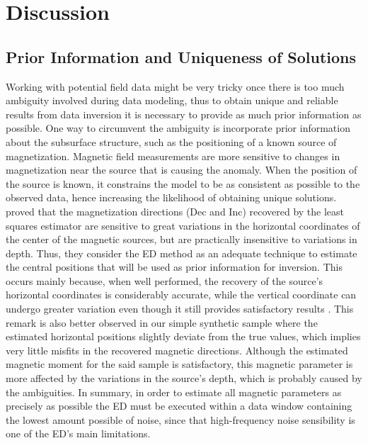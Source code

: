 \section{Discussion}

\subsection{Prior Information and Uniqueness of Solutions}
Working with potential field data might be very tricky once there is too much ambiguity involved during data modeling, thus to obtain unique and reliable results from data inversion it is necessary to provide as much prior information as possible. One way to circumvent the ambiguity is incorporate prior information about the subsurface structure, such as the positioning of a known source of magnetization. Magnetic field measurements are more sensitive to changes in magnetization near the source that is causing the anomaly. When the position of the source is known, it constrains the model to be as consistent as possible to the observed data, hence increasing the likelihood of obtaining unique solutions. \citet{Oliveira2015Estimation} proved that the magnetization directions (Dec and Inc) recovered by the least squares estimator are sensitive to great variations in the horizontal coordinates of the center of the magnetic sources, but are practically insensitive to variations in depth. Thus, they consider the ED method as an adequate technique to estimate the central positions that will be used as prior information for inversion. This occurs mainly because, when well performed, the recovery of the source's horizontal coordinates is considerably accurate, while the vertical coordinate can undergo greater variation even though it still provides satisfactory results \citep{Silva20033D, Melo2013}. This remark is also better observed in our simple synthetic sample where the estimated horizontal positions slightly deviate from the true values, which implies very little misfits in the recovered magnetic directions. Although the estimated magnetic moment for the said sample is satisfactory, this magnetic parameter is more affected by the variations in the source's depth, which is probably caused by the ambiguities. In summary, in order to estimate all magnetic parameters as precisely as possible the ED must be executed within a data window containing the lowest amount possible of noise, since that high-frequency noise sensibility is one of the ED's main limitations.

